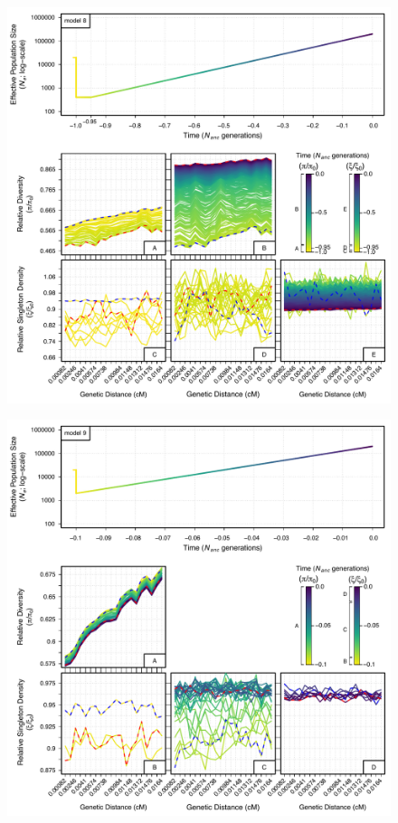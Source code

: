 \documentclass[9pt,twocolumn,twoside]{rilabRxiv}
\begin{document}
\begin{figure}[htb]\ContinuedFloat
    \centering
    \includegraphics[width=\linewidth]{figures/FigS16.pdf}
\end{figure}
\begin{figure}[htb]\ContinuedFloat
    \centering                   \includegraphics[width=\linewidth]{figures/FigS17.pdf}
\end{figure}
\end{document}
